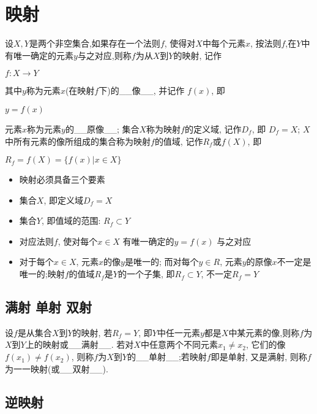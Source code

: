\documentclass[11pt]{article}
\providecommand{\tightlist}{%
      \setlength{\itemsep}{0pt}\setlength{\parskip}{0pt}}
\begin{document}
\section{映射}\label{ux6620ux5c04}

设\(X, Y\)是两个非空集合,如果存在一个法则\(f\),
使得对\(X\)中每个元素\(x\),
按法则\(f\),在\(Y\)中有唯一确定的元素\(y\)与之对应,则称\(f\)为从\(X\)到\(Y\)的映射,
记作

\(f : X \rightarrow Y\)

其中\(y\)称为元素\(x\)(在映射\(f\)下)的\_\_像\_\_, 并记作 \(f(x)\), 即

\(y = f(x)\)

元素\(x\)称为元素\(y\)的\_\_原像\_\_; 集合\(X\)称为映射\(f\)的定义域,
记作\(D_{f}\), 即 \(D_{f}=X\);
\(X\)中所有元素的像所组成的集合称为映射\(f\)的值域,
记作\(R_{f}\)或\(f(X)\), 即

\(R_{f}=f(X)=\{f(x) | x \in X\}\)

\begin{itemize}
\tightlist
\item
  映射必须具备三个要素
\item
  集合\(X\), 即定义域\(D_{f} = X\)
\item
  集合\(Y\), 即值域的范围: \(R_{f} \subset Y\)
\item
  对应法则\(f\), 使对每个\(x \in X\) 有唯一确定的\(y = f(x)\) 与之对应
\item
  对于每个\(x \in X\), 元素\(x\)的像\(y\)是唯一的; 而对每个\(y \in R\),
  元素\(y\)的原像\(x\)不一定是唯一的;映射\(f\)的值域\(R_{f}\)是\(Y\)的一个子集,
  即\(R_{f} \subset Y\), 不一定\(R_{f} = Y\)
\end{itemize}

\subsection{满射 单射
双射}\label{ux6ee1ux5c04-ux5355ux5c04-ux53ccux5c04}

设\(f\)是从集合\(X\)到\(Y\)的映射, 若\(R_{f} = Y\),
即\(Y\)中任一元素\(y\)都是\(X\)中某元素的像,则称\(f\)为\(X\)到\(Y\)上的映射或\_\_满射\_\_.
若对\(X\)中任意两个不同元素\(x_{1} \ne x_{2}\),
它们的像\(f(x_{1}) \ne f(x_{2})\),
则称\(f\)为\(X\)到\(Y\)的\_\_单射\_\_;若映射\(f\)即是单射, 又是满射,
则称\(f\)为一一映射(或\_\_双射\_\_).

\subsection{逆映射}\label{ux9006ux6620ux5c04}
\end{document}
